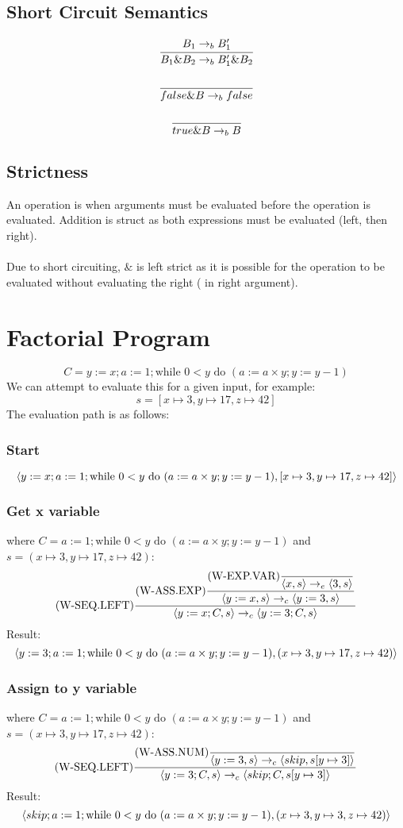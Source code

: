\documentclass{report}
\begin{document}
\subsection*{Short Circuit Semantics}
\[\cfrac{B_1 \to_b B'_1}{B_1 \& B_2 \to_b B_1' \& B_2}\]
\[\cfrac{}{false \& B \to_b false}\]
\[\cfrac{}{true \& B \to_b B}\]
\subsection*{Strictness}
An operation is  when arguments must be evaluated before the operation is evaluated. Addition is struct as both expressions must be evaluated (left, then right).
\\
\\ Due to short circuiting, $\&$ is left strict as it is possible for the operation to be evaluated without evaluating the right ( in right argument).

\section*{Factorial Program}
\[C = y:= x; a:= 1;\text{while }0<y \text{ do } (a:= a \times y; y:= y - 1)\]
We can attempt to evaluate this for a given input, for example:
\[s = [x \mapsto 3, y \mapsto 17, z \mapsto 42]\]
The evaluation path is as follows:
\subsubsection*{Start}
\[\langle y:= x; a:= 1;\text{while }0<y \text{ do } (a:= a \times y; y:= y - 1), [x \mapsto 3, y \mapsto 17, z \mapsto 42] \rangle\]
\subsubsection*{Get x variable}
where $C = a:= 1;\text{while }0<y \text{ do } (a:= a \times y; y:= y - 1)$ and $s = (x \mapsto 3, y \mapsto 17, z \mapsto 42)$:
\[\text{(W-SEQ.LEFT)}\dfrac{
		\text{(W-ASS.EXP)}\dfrac{
			\text{(W-EXP.VAR)}\dfrac{}{\langle x, s \rangle \to_e \langle 3, s \rangle}
		}{\langle y:= x, s \rangle \to_c \langle y := 3, s \rangle}
	}{\langle y:= x; C, s \rangle \to_c \langle y:=3;C, s \rangle}\]
Result:
\[\langle y:= 3; a:= 1;\text{while }0<y \text{ do } (a:= a \times y; y:= y - 1), (x \mapsto 3, y \mapsto 17, z \mapsto 42) \rangle\]
\subsubsection*{Assign to y variable}
where $C = a:= 1;\text{while }0<y \text{ do } (a:= a \times y; y:= y - 1)$ and $s = (x \mapsto 3, y \mapsto 17, z \mapsto 42)$:
\[\text{(W-SEQ.LEFT)}\dfrac{
		\text{(W-ASS.NUM)}\dfrac{}{\langle y:=3, s \rangle \to_c \langle skip, s[y \mapsto 3] \rangle}
	}{\langle y:= 3; C, s \rangle \to_c \langle skip;C, s[y \mapsto 3] \rangle}\]
Result:
\[\langle skip; a:= 1;\text{while }0<y \text{ do } (a:= a \times y; y:= y - 1), (x \mapsto 3, y \mapsto 3, z \mapsto 42) \rangle\]
\end{document}
